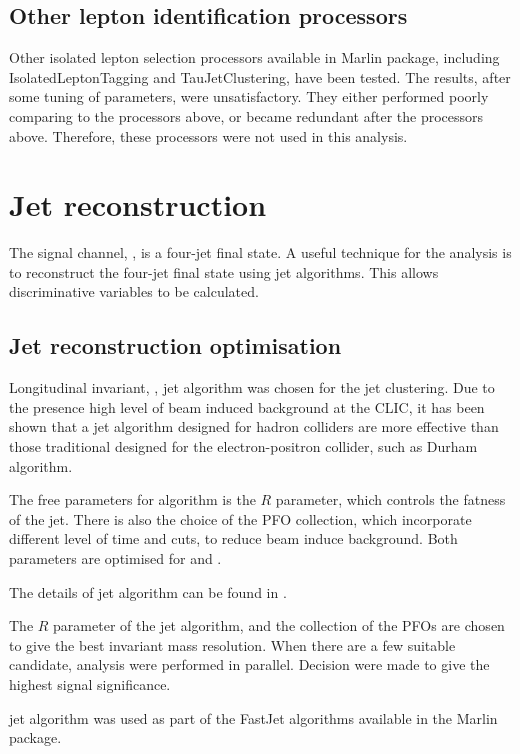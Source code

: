 \subsection{Other lepton identification processors}

Other isolated lepton selection processors available in Marlin package, including IsolatedLeptonTagging and TauJetClustering, have been tested. The results, after some tuning of parameters, were unsatisfactory. They either performed poorly comparing to the processors above, or became redundant after the processors above. Therefore, these processors were not used in this analysis.

\section{Jet reconstruction}

The signal channel, \eeToHHbbWWHad, is a four-jet final state. A useful technique for the analysis is to reconstruct the four-jet final state using jet algorithms. This allows discriminative variables to be calculated.

\subsection{Jet reconstruction optimisation}
\label{sec:doubleHiggsJetOptimisation}
Longitudinal invariant, \kt, jet algorithm was chosen for the jet clustering. Due to the presence high level of beam induced background at the CLIC, it has been shown that a jet algorithm designed for hadron colliders are more effective than those traditional designed for the electron-positron collider, such as Durham algorithm.\cite{}

The free parameters for \kt algorithm is the $R$ parameter, which controls the fatness of the jet. There is also the choice of the PFO collection, which incorporate different level of time and \pT cuts, to reduce beam induce background. Both parameters are optimised for  and .

The details of jet algorithm can be found in \Section{}.

The $R$ parameter of the \kt jet algorithm, and the collection of the PFOs are chosen to give the best invariant mass resolution. When there are a few suitable candidate, analysis were performed in parallel. Decision were made to give the highest signal significance.

\kt jet algorithm was used as part of the FastJet algorithms available in the Marlin package.

